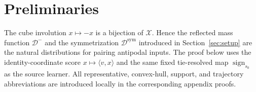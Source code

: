 \section{Preliminaries}
\label{sec:preliminaries}

The cube involution $x\mapsto -x$ is a bijection of $\mathcal X$.  Hence the
reflected mass function $\mathcal D^-$ and the symmetrization
$\mathcal D^{\mathrm{sym}}$ introduced in Section~\ref{sec:setup} are the
natural distributions for pairing antipodal inputs.  The proof below uses the
identity-coordinate score $x\mapsto\langle v,x\rangle$ and the same fixed
tie-resolved map $\operatorname{sign}_{s_0}$ as the source learner.  All
representative, convex-hull, support, and trajectory abbreviations are
introduced locally in the corresponding appendix proofs.
